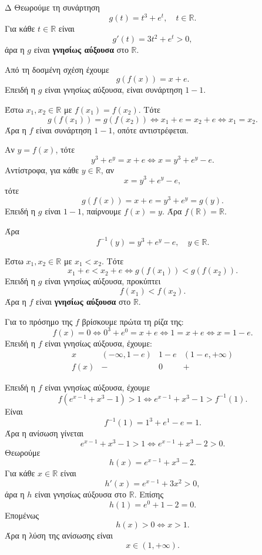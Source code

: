 \begin{thema}{Δ}
Θεωρούμε τη συνάρτηση
\[
g(t)=t^3+e^t,\quad t\in\mathbb{R}.
\]
Για κάθε $t\in\mathbb{R}$ είναι
\[
g'(t)=3t^2+e^t>0,
\]
άρα η $g$ είναι \textbf{γνησίως αύξουσα} στο $\mathbb{R}$.
\begin{erwthma}
\item Από τη δοσμένη σχέση έχουμε
\[
g(f(x))=x+e.
\]
Επειδή η $g$ είναι γνησίως αύξουσα, είναι συνάρτηση $1-1$.

Έστω $x_1,x_2\in\mathbb{R}$ με $f(x_1)=f(x_2)$. Τότε
\[
g(f(x_1))=g(f(x_2))
\Leftrightarrow x_1+e=x_2+e
\Leftrightarrow x_1=x_2.
\]
Άρα η $f$ είναι συνάρτηση $1-1$, οπότε αντιστρέφεται.

Αν $y=f(x)$, τότε
\[
y^3+e^y=x+e
\Leftrightarrow x=y^3+e^y-e.
\]
Αντίστροφα, για κάθε $y\in\mathbb{R}$, αν
\[
x=y^3+e^y-e,
\]
τότε
\[
g(f(x))=x+e=y^3+e^y=g(y).
\]
Επειδή η $g$ είναι $1-1$, παίρνουμε $f(x)=y$. Άρα $f(\mathbb{R})=\mathbb{R}$.

Άρα
\[
{f^{-1}(y)=y^3+e^y-e,\quad y\in\mathbb{R}}.
\]

\item Έστω $x_1,x_2\in\mathbb{R}$ με $x_1<x_2$. Τότε
\[
x_1+e<x_2+e
\Leftrightarrow g(f(x_1))<g(f(x_2)).
\]
Επειδή η $g$ είναι γνησίως αύξουσα, προκύπτει
\[
f(x_1)<f(x_2).
\]
Άρα η $f$ είναι \textbf{γνησίως αύξουσα} στο $\mathbb{R}$.

Για το πρόσημο της $f$ βρίσκουμε πρώτα τη ρίζα της:
\[
f(x)=0
\Leftrightarrow 0^3+e^0=x+e
\Leftrightarrow 1=x+e
\Leftrightarrow x=1-e.
\]
Επειδή η $f$ είναι γνησίως αύξουσα, έχουμε:
\[
\begin{array}{c|ccc}
x & (-\infty,1-e) & 1-e & (1-e,+\infty)\\ \hline
f(x) & - & 0 & +
\end{array}
\]

\item Επειδή η $f$ είναι γνησίως αύξουσα, έχουμε
\[
f(e^{x-1}+x^3-1)>1
\Leftrightarrow e^{x-1}+x^3-1>f^{-1}(1).
\]
Είναι
\[
f^{-1}(1)=1^3+e^1-e=1.
\]
Άρα η ανίσωση γίνεται
\[
e^{x-1}+x^3-1>1
\Leftrightarrow e^{x-1}+x^3-2>0.
\]
Θεωρούμε
\[
h(x)=e^{x-1}+x^3-2.
\]
Για κάθε $x\in\mathbb{R}$ είναι
\[
h'(x)=e^{x-1}+3x^2>0,
\]
άρα η $h$ είναι γνησίως αύξουσα στο $\mathbb{R}$. Επίσης
\[
h(1)=e^0+1-2=0.
\]
Επομένως
\[
h(x)>0\Leftrightarrow x>1.
\]
Άρα η λύση της ανίσωσης είναι
\[
{x\in(1,+\infty)}.
\]


\end{erwthma}
\end{thema}
